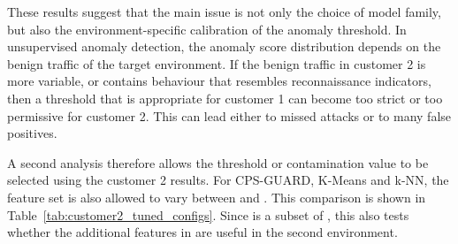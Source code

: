 These results suggest that the main issue is not only the choice of model family, but also the environment-specific calibration of the anomaly threshold. In unsupervised anomaly detection, the anomaly score distribution depends on the benign traffic of the target environment. If the benign traffic in customer 2 is more variable, or contains behaviour that resembles reconnaissance indicators, then a threshold that is appropriate for customer 1 can become too strict or too permissive for customer 2. This can lead either to missed attacks or to many false positives.

A second analysis therefore allows the threshold or contamination value to be selected using the customer 2 results. For CPS-GUARD, K-Means and k-NN, the feature set is also allowed to vary between  and . This comparison is shown in Table~\ref{tab:customer2_tuned_configs}. Since  is a subset of , this also tests whether the additional features in  are useful in the second environment.



